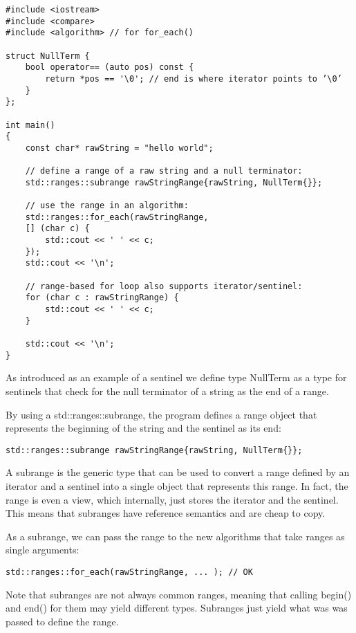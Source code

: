 \begin{lstlisting}[style=styleCXX]
#include <iostream>
#include <compare>
#include <algorithm> // for for_each()

struct NullTerm {
	bool operator== (auto pos) const {
		return *pos == '\0'; // end is where iterator points to ’\0’
	}
};

int main()
{
	const char* rawString = "hello world";
	
	// define a range of a raw string and a null terminator:
	std::ranges::subrange rawStringRange{rawString, NullTerm{}};
	
	// use the range in an algorithm:
	std::ranges::for_each(rawStringRange,
	[] (char c) {
		std::cout << ' ' << c;
	});
	std::cout << '\n';
	
	// range-based for loop also supports iterator/sentinel:
	for (char c : rawStringRange) {
		std::cout << ' ' << c;
	}
	
	std::cout << '\n';
}
\end{lstlisting}

As introduced as an example of a sentinel we define type NullTerm as a type for sentinels that check for the null terminator of a string as the end of a range.

By using a std::ranges::subrange, the program defines a range object that represents the beginning of the string and the sentinel as its end:

\begin{lstlisting}[style=styleCXX]
std::ranges::subrange rawStringRange{rawString, NullTerm{}};
\end{lstlisting}

A subrange is the generic type that can be used to convert a range defined by an iterator and a sentinel into a single object that represents this range. In fact, the range is even a view, which internally, just stores the iterator and the sentinel. This means that subranges have reference semantics and are cheap to copy.

As a subrange, we can pass the range to the new algorithms that take ranges as single arguments:

\begin{lstlisting}[style=styleCXX]
std::ranges::for_each(rawStringRange, ... ); // OK
\end{lstlisting}

Note that subranges are not always common ranges, meaning that calling begin() and end() for them may yield different types. Subranges just yield what was was passed to define the range.

